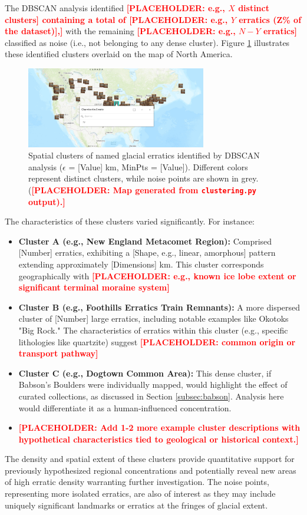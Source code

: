 \documentclass[
11pt, %
english, %
singlespacing, %
headsepline, %
]{MastersDoctoralThesis} %
\newcommand{\placeholdertext}[1]{\textcolor{red}{\textbf{[PLACEHOLDER: #1]}}}
\begin{document}
The DBSCAN analysis identified \placeholdertext{e.g., $X$ distinct clusters] containing a total of \placeholdertext{e.g., $Y$ erratics (Z\% of the dataset)},} with the remaining \placeholdertext{e.g., $N-Y$ erratics} classified as noise (i.e., not belonging to any dense cluster). Figure \ref{fig:erratic_clusters} illustrates these identified clusters overlaid on the map of North America.

\begin{figure}[H]
    \centering
    \includegraphics[width=0.7\textwidth]{Images/DigitizedMap.png} %
    \caption{Spatial clusters of named glacial erratics identified by DBSCAN analysis ($\epsilon$ = [Value] km, MinPts = [Value]). Different colors represent distinct clusters, while noise points are shown in grey. (\placeholdertext{Map generated from \texttt{clustering.py} output).}}
    \label{fig:erratic_clusters}
\end{figure}

The characteristics of these clusters varied significantly. For instance:
\begin{itemize}
    \item \textbf{Cluster A (e.g., New England Metacomet Region):} Comprised [Number] erratics, exhibiting a [Shape, e.g., linear, amorphous] pattern extending approximately [Dimensions] km. This cluster corresponds geographically with \placeholdertext{e.g., known ice lobe extent or significant terminal moraine system}
    \item \textbf{Cluster B (e.g., Foothills Erratics Train Remnants):} A more dispersed cluster of [Number] large erratics, including notable examples like Okotoks "Big Rock." The characteristics of erratics within this cluster (e.g., specific lithologies like quartzite) suggest \placeholdertext{common origin or transport pathway}
    \item \textbf{Cluster C (e.g., Dogtown Common Area):} This dense cluster, if Babson's Boulders were individually mapped, would highlight the effect of curated collections, as discussed in Section \ref{subsec:babson}. Analysis here would differentiate it as a human-influenced concentration.
    \item \placeholdertext{Add 1-2 more example cluster descriptions with hypothetical characteristics tied to geological or historical context.}
\end{itemize}
The density and spatial extent of these clusters provide quantitative support for previously hypothesized regional concentrations and potentially reveal new areas of high erratic density warranting further investigation. The noise points, representing more isolated erratics, are also of interest as they may include uniquely significant landmarks or erratics at the fringes of glacial extent.
\end{document}
